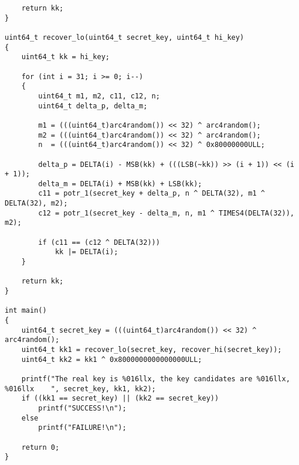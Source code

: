 \begin{verbatim}
	return kk;
}

uint64_t recover_lo(uint64_t secret_key, uint64_t hi_key)
{
	uint64_t kk = hi_key;

	for (int i = 31; i >= 0; i--)
	{
		uint64_t m1, m2, c11, c12, n;
		uint64_t delta_p, delta_m;

		m1 = (((uint64_t)arc4random()) << 32) ^ arc4random();
		m2 = (((uint64_t)arc4random()) << 32) ^ arc4random();
		n  = (((uint64_t)arc4random()) << 32) ^ 0x80000000ULL;

		delta_p = DELTA(i) - MSB(kk) + (((LSB(~kk)) >> (i + 1)) << (i + 1));
		delta_m = DELTA(i) + MSB(kk) + LSB(kk);
		c11 = potr_1(secret_key + delta_p, n ^ DELTA(32), m1 ^ DELTA(32), m2);
		c12 = potr_1(secret_key - delta_m, n, m1 ^ TIMES4(DELTA(32)), m2);

		if (c11 == (c12 ^ DELTA(32)))
			kk |= DELTA(i);
	}

	return kk;
}

int main()
{
	uint64_t secret_key = (((uint64_t)arc4random()) << 32) ^ arc4random();
	uint64_t kk1 = recover_lo(secret_key, recover_hi(secret_key));
	uint64_t kk2 = kk1 ^ 0x8000000000000000ULL;

	printf("The real key is %016llx, the key candidates are %016llx, %016llx    ", secret_key, kk1, kk2);
	if ((kk1 == secret_key) || (kk2 == secret_key))
		printf("SUCCESS!\n");
	else
		printf("FAILURE!\n");

	return 0;
}
\end{verbatim}

\renewcommand\thesection{\arabic{section}}
